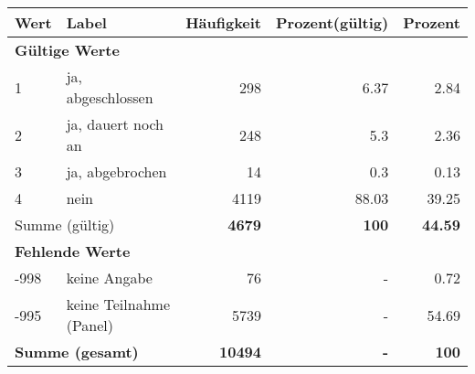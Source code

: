      \begin{longtable}{lXrrr}
     \toprule
     \textbf{Wert} & \textbf{Label} & \textbf{Häufigkeit} & \textbf{Prozent(gültig)} & \textbf{Prozent} \\
     \endhead
     \midrule
     \multicolumn{5}{l}{\textbf{Gültige Werte}}\\

     1 &
     \multicolumn{1}{X}{ ja, abgeschlossen   } &


       \num{298} &
       \num[round-mode=places,round-precision=2]{6,37} &
         \num[round-mode=places,round-precision=2]{2,84} \\

     2 &
     \multicolumn{1}{X}{ ja, dauert noch an   } &


       \num{248} &
       \num[round-mode=places,round-precision=2]{5,3} &
         \num[round-mode=places,round-precision=2]{2,36} \\

     3 &
     \multicolumn{1}{X}{ ja, abgebrochen   } &


       \num{14} &
       \num[round-mode=places,round-precision=2]{0,3} &
         \num[round-mode=places,round-precision=2]{0,13} \\

     4 &
     \multicolumn{1}{X}{ nein   } &


       \num{4119} &
       \num[round-mode=places,round-precision=2]{88,03} &
         \num[round-mode=places,round-precision=2]{39,25} \\
     \midrule
     \multicolumn{2}{l}{Summe (gültig)} &
       \textbf{\num{4679}} &
     \textbf{100} &
       \textbf{\num[round-mode=places,round-precision=2]{44,59}} \\
     \multicolumn{5}{l}{\textbf{Fehlende Werte}}\\
       -998 &
       keine Angabe &
         \num{76} &
        - &
         \num[round-mode=places,round-precision=2]{0,72} \\
       -995 &
       keine Teilnahme (Panel) &
         \num{5739} &
        - &
         \num[round-mode=places,round-precision=2]{54,69} \\
     \midrule
     \multicolumn{2}{l}{\textbf{Summe (gesamt)}} &
          \textbf{\num{10494}} &
        \textbf{-} &
        \textbf{100} \\
     \bottomrule
     \end{longtable}
     
